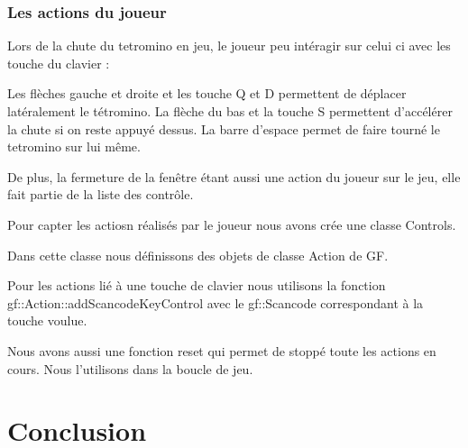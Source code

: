 \documentclass[a4paper, 12pt]{article}
\begin{document}
		\subsubsection{Les actions du joueur}

			Lors de la chute du tetromino en jeu, le joueur peu intéragir sur celui ci avec les touche du clavier :

			Les flèches gauche et droite et les touche Q et D permettent de déplacer latéralement le tétromino.
			La flèche du bas et la touche S permettent d’accélérer la chute si on reste appuyé dessus.
			La barre d’espace permet de faire tourné le tetromino sur lui même.

			De plus, la fermeture de la fenêtre étant aussi une action du joueur sur le jeu, elle fait partie de la liste des contrôle.


			Pour capter les actiosn réalisés par le joueur nous avons crée une classe Controls.

			Dans cette classe nous définissons des objets de classe Action de GF.

			Pour les actions lié à une touche de clavier nous utilisons la fonction gf::Action::addScancodeKeyControl avec le gf::Scancode correspondant à la touche voulue.

			Nous avons aussi une fonction reset qui permet de stoppé toute les actions en cours. Nous l’utilisons dans la boucle de jeu.
	
	

\section*{Conclusion}
\end{document}
